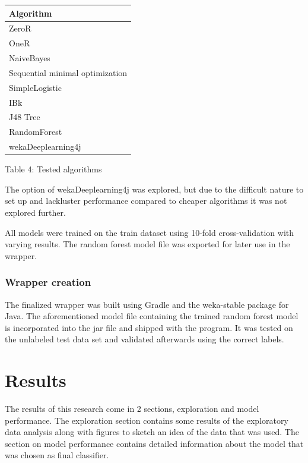 \documentclass[
]{article}
\begin{document}
\begin{longtable}[]{@{}l@{}}
\toprule
Algorithm \\
\midrule
\endhead
ZeroR \\
OneR \\
NaiveBayes \\
Sequential minimal optimization \\
SimpleLogistic \\
IBk \\
J48 Tree \\
RandomForest \\
wekaDeeplearning4j \\
\bottomrule
\end{longtable}

\begin{center}
Table 4: Tested algorithms \label{tab:tab4}
\end{center}

The option of wekaDeeplearning4j was explored, but due to the difficult
nature to set up and lackluster performance compared to cheaper
algorithms it was not explored further.

All models were trained on the train dataset using 10-fold
cross-validation with varying results. The random forest model file was
exported for later use in the wrapper.

\hypertarget{wrapper-creation}{%
\subsubsection{Wrapper creation}\label{wrapper-creation}}

The finalized wrapper was built using Gradle and the weka-stable package
for Java. The aforementioned model file containing the trained random
forest model is incorporated into the jar file and shipped with the
program. It was tested on the unlabeled test data set and validated
afterwards using the correct labels.

\newpage

\hypertarget{results}{%
\section{Results}\label{results}}

The results of this research come in 2 sections, exploration and model
performance. The exploration section contains some results of the
exploratory data analysis along with figures to sketch an idea of the
data that was used. The section on model performance contains detailed
information about the model that was chosen as final classifier.
\end{document}
